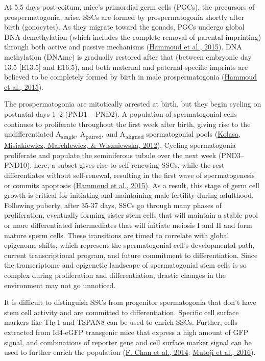 \documentclass[12pt,twoside]{reedthesis}
\begin{document}
At 5.5 days post-coitum, mice's primordial germ cells (PGCs), the
precursors of prospermatogonia, arise. SSCs are formed by
prospermatogonia shortly after birth (gonocytes). As they migrate toward
the gonads, PGCs undergo global DNA demethylation (which includes the
complete removal of parental imprinting) through both active and passive
mechanisms (\protect\hyperlink{ref-hammoud2015}{Hammoud et al., 2015}). DNA methylation (DNAme) is gradually restored
after that (between embryonic day 13.5 {[}E13.5{]} and E16.5), and both
maternal and paternal-specific imprints are believed to be completely
formed by birth in male prospermatogonia (\protect\hyperlink{ref-hammoud2015}{Hammoud et al., 2015}).

The prospermatogonia are mitotically arrested at birth, but they begin
cycling on postnatal days 1--2 (PND1 -- PND2). A population of
spermatogonial cells continues to proliferate throughout the first week
after birth, giving rise to the undifferentiated
A\textsubscript{single}, A\textsubscript{paired}, and
A\textsubscript{aligned} spermatogonial pools (\protect\hyperlink{ref-kolasa2012}{Kolasa, Misiakiewicz, Marchlewicz, \& Wiszniewska, 2012}). Cycling
spermatogonia proliferate and populate the seminiferous tubule over the
next week (PND3--PND10); here, a subset gives rise to self-renewing
SSCs, while the rest differentiates without self-renewal, resulting in
the first wave of spermatogenesis or commits apoptosis (\protect\hyperlink{ref-hammoud2015}{Hammoud et al., 2015}).
As a result, this stage of germ cell growth is critical for initiating
and maintaining male fertility during adulthood. Following puberty,
after 35-37 days, SSCs go through many phases of proliferation,
eventually forming sister stem cells that will maintain a stable pool or
more differentiated intermediates that will initiate meiosis I and II
and form mature sperm cells. These transitions are timed to correlate with global epigenome
shifts, which represent the spermatogonial cell's developmental path,
current transcriptional program, and future commitment to
differentiation. Since the transcriptome and epigenetic landscape of
spermatogonial stem cells is so complex during proliferation and
differentiation, drastic changes in the environment may not go
unnoticed.

It is difficult to distinguish SSCs from progenitor spermatogonia that
don't have stem cell activity and are committed to differentiation.
Specific cell surface markers like Thy1 and TSPAN8 can be used to enrich
SSCs. Further, cells extracted from Id4-eGFP transgenic mice that
express a high amount of GFP signal, and combinations of reporter gene
and cell surface marker signal can be used to further enrich the
population (\protect\hyperlink{ref-chan2014}{F. Chan et al., 2014}; \protect\hyperlink{ref-mutoji2016}{Mutoji et al., 2016}).
\end{document}
